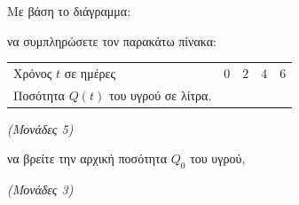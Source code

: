 \documentclass[11pt,a4paper,twoside]{book}
\newcommand{\monades}[1]{\hfill \textit{(Μονάδες #1)}}
\begin{document}
\begin{alist}
\item Με βάση το διάγραμμα:

\end{alist}
\begin{alist}
\item
  να συμπληρώσετε τον παρακάτω πίνακα:

\begin{longtable}[]{@{}
  >{\raggedright\arraybackslash}p{}
  >{\raggedright\arraybackslash}p{}
  >{\raggedright\arraybackslash}p{}
  >{\raggedright\arraybackslash}p{}
  >{\raggedright\arraybackslash}p{}@{}}
\noalign{}
\begin{minipage}[b]{\linewidth}\raggedright
Χρόνος $t$ σε ημέρες
\end{minipage} & \begin{minipage}[b]{\linewidth}\raggedright
\begin{equation*}0\end{equation*}
\end{minipage} & \begin{minipage}[b]{\linewidth}\raggedright
\begin{equation*}2\end{equation*}
\end{minipage} & \begin{minipage}[b]{\linewidth}\raggedright
\begin{equation*}4\end{equation*}
\end{minipage} & \begin{minipage}[b]{\linewidth}\raggedright
\begin{equation*}6\end{equation*}
\end{minipage} \\
\noalign{}

\noalign{}
\endlastfoot
Ποσότητα $Q(t)$ του υγρού σε λίτρα. & & & & \\
\end{longtable}

\monades{5}


\end{alist}
\begin{alist}
\item
  να βρείτε την αρχική ποσότητα $Q_{0}$ του υγρού,

\monades{3}


\end{alist}
\end{document}
